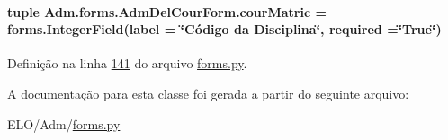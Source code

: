 \paragraph[{cour\+Matric}]{\setlength{\rightskip}{0pt plus 5cm}tuple Adm.\+forms.\+Adm\+Del\+Cour\+Form.\+cour\+Matric = forms.\+Integer\+Field(label = \char`\"{}Código da Disciplina\char`\"{}, required =\char`\"{}True\char`\"{})\hspace{0.3cm}{\ttfamily [static]}}\label{classAdm_1_1forms_1_1AdmDelCourForm_a8ed2bcde12e5bb321960517b3c653b2f}


Definição na linha \hyperlink{Adm_2forms_8py_source_l00141}{141} do arquivo \hyperlink{Adm_2forms_8py_source}{forms.\+py}.



A documentação para esta classe foi gerada a partir do seguinte arquivo\+:\begin{DoxyCompactItemize}
\item 
E\+L\+O/\+Adm/\hyperlink{Adm_2forms_8py}{forms.\+py}\end{DoxyCompactItemize}
